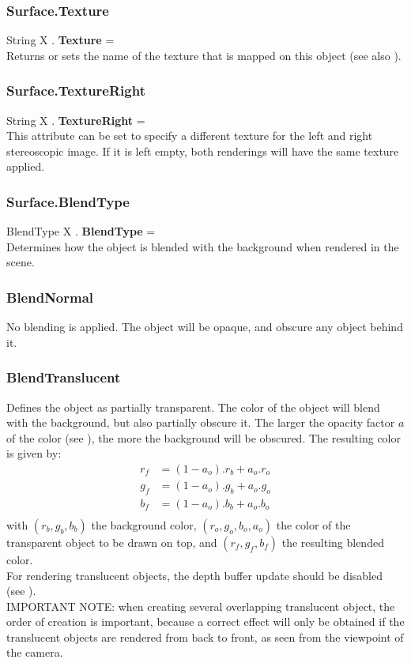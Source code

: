 \subsubsection{Surface.Texture \label{F:Surface:Texture}}
String X . \textbf{Texture} = \\
Returns or sets the name of the texture that is mapped on this object (see also ).

\subsubsection{Surface.TextureRight \label{F:Surface:TextureRight}}
String X . \textbf{TextureRight} = \\
This attribute can be set to specify a different texture for the left and right stereoscopic image. If it is left empty, both renderings will have the same texture applied.

\subsubsection{Surface.BlendType \label{F:Surface:BlendType}}
BlendType X . \textbf{BlendType} = \\
Determines how the object is blended with the background when rendered in the scene.

\subsubsection{BlendNormal \label{T:BlendType|BlendNormal}}
No blending is applied. The object will be opaque, and obscure any object behind it.

\subsubsection{BlendTranslucent \label{T:BlendType|BlendTranslucent}}
Defines the object as partially transparent. The color of the object will blend with the background, but also partially obscure it. The larger the opacity factor $a$ of the color (see ), the more the background will be obscured. The resulting color is given by:
\begin{equation}
\begin{array}{rcl}
r_f & = (1-a_o) . r_b + a_o . r_o \\
g_f & = (1-a_o) . g_b + a_o . g_o \\
b_f & = (1-a_o) . b_b + a_o . b_o \\
\end{array}
\end{equation}
with $(r_b,g_b,b_b)$ the background color, $(r_o,g_o,b_o,a_o)$ the color of the transparent object to be drawn on top, and $(r_f,g_f,b_f)$ the resulting blended color. \\
For rendering translucent objects, the depth buffer update should be disabled (see ). \\
IMPORTANT NOTE: when creating several overlapping translucent object, the order of creation is important, because a correct effect will only be obtained if the translucent objects are rendered from back to front, as seen from the viewpoint of the camera.


